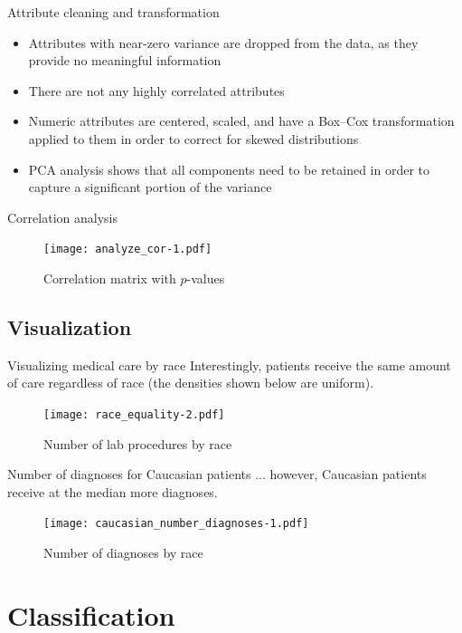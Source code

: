 \documentclass[serif, hyperref={unicode}, xcolor={x11names, psnames, dvipsnames,
  table}, usepdftitle=false]{beamer}
\begin{document}
\begin{frame}{Attribute cleaning and transformation}
  \begin{itemize}
  \item Attributes with near-zero variance are dropped from the data, as they
    provide no meaningful information
  \item There are not any highly correlated attributes
  \item Numeric attributes are centered, scaled, and have a Box--Cox
    transformation applied to them in order to correct for skewed distributions
  \item PCA analysis shows that all components need to be retained in order to
    capture a significant portion of the variance
  \end{itemize}
\end{frame}

\begin{frame}{Correlation analysis}
  \begin{figure}[!h]
    \texttt{[image: analyze\_cor-1.pdf]}
    \caption{Correlation matrix with $p$-values}
  \end{figure}
\end{frame}

\subsection{Visualization}
\begin{frame}{Visualizing medical care by race}
  Interestingly, patients receive the same amount of care regardless of race
  (the densities shown below are uniform).

  \begin{figure}[!h]
    \texttt{[image: race\_equality-2.pdf]}
    \caption{Number of lab procedures by race}
  \end{figure}
\end{frame}

\begin{frame}{Number of diagnoses for Caucasian patients}
  ... however, Caucasian patients receive at the median more diagnoses.

  \begin{figure}[!h]
    \texttt{[image: caucasian\_number\_diagnoses-1.pdf]}
    \caption{Number of diagnoses by race}
  \end{figure}
\end{frame}

\section{Classification}
\end{document}
